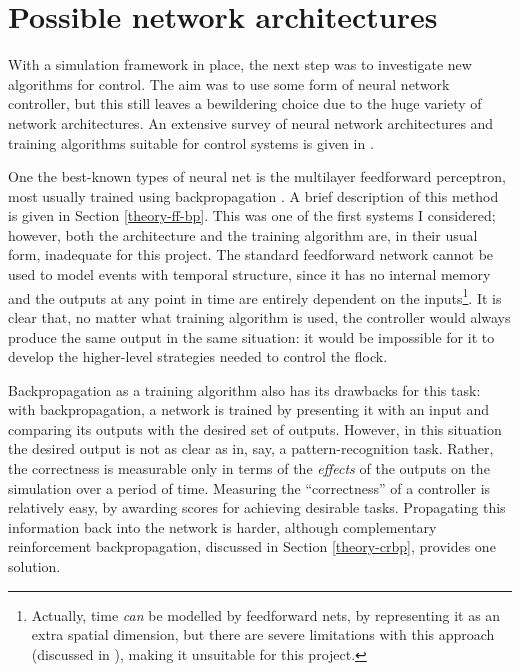 \documentclass[a4paper]{report}
\begin{document}
\section{Possible network architectures}

\label{net-archis}

With a simulation framework in place, the next step was to investigate
new algorithms for control. The aim was to use some form of neural
network controller, but this still leaves a bewildering choice due to
the huge variety of network architectures. An extensive survey of
neural network architectures and training algorithms suitable for
control systems is given in \cite{hunt92}.

One the best-known types of neural net is the multilayer feedforward
perceptron, most usually trained using backpropagation
\cite{rumelhart86}. A brief description of this method is given in
Section \ref{theory-ff-bp}. This was one of the first systems I
considered; however, both the architecture and the training algorithm
are, in their usual form, inadequate for this project. The standard
feedforward network cannot be used to model events with temporal
structure, since it has no internal memory and the outputs at any
point in time are entirely dependent on the inputs\footnote{Actually,
  time \emph{can} be modelled by feedforward nets, by representing it
  as an extra spatial dimension, but there are severe limitations with
  this approach (discussed in \cite{elman90}), making it unsuitable for
  this project.}. It is clear that, no matter what training algorithm
is used, the controller would always produce the same output in the
same situation: it would be impossible for it to develop the
higher-level strategies needed to control the flock.

Backpropagation as a training algorithm also has its drawbacks for
this task: with backpropagation, a network is trained by presenting it
with an input and comparing its outputs with the desired set of
outputs. However, in this situation the desired output is not as
clear as in, say, a pattern-recognition task. Rather, the correctness
is measurable only in terms of the \emph{effects} of the outputs on
the simulation over a period of time. Measuring the ``correctness'' of
a controller is relatively easy, by awarding scores for achieving
desirable tasks. Propagating this information back into the network is
harder, although complementary reinforcement backpropagation,
discussed in Section \ref{theory-crbp}, provides one solution.
\end{document}

